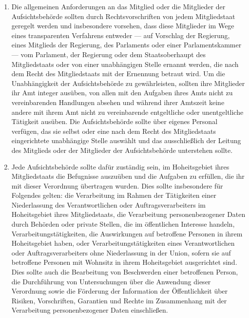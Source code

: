 \begin{enumerate}
   \item Die allgemeinen Anforderungen an das Mitglied oder die Mitglieder der Aufsichtsbehörde sollten durch
    Rechtsvorschriften von jedem Mitgliedstaat geregelt werden und insbesondere vorsehen, dass diese Mitglieder im Wege
    eines transparenten Verfahrens entweder — auf Vorschlag der Regierung, eines Mitglieds der Regierung, des
    Parlaments oder einer Parlamentskammer — vom Parlament, der Regierung oder dem Staatsoberhaupt des Mitgliedstaats
    oder von einer unabhängigen Stelle ernannt werden, die nach dem Recht des Mitgliedstaats mit der Ernennung betraut
    wird. Um die Unabhängigkeit der Aufsichtsbehörde zu gewährleisten, sollten ihre Mitglieder ihr Amt integer ausüben,
    von allen mit den Aufgaben ihres Amts nicht zu vereinbarenden Handlungen absehen und während ihrer Amtszeit keine
    andere mit ihrem Amt nicht zu vereinbarende entgeltliche oder unentgeltliche Tätigkeit ausüben. Die
    Aufsichtsbehörde sollte über eigenes Personal verfügen, das sie selbst oder eine nach dem Recht des Mitgliedstaats
    eingerichtete unabhängige Stelle auswählt und das ausschließlich der Leitung des Mitglieds oder der Mitglieder der
    Aufsichtsbehörde unterstehen sollte.%
   \label{eg:121}
   

   \item Jede Aufsichtsbehörde sollte dafür zuständig sein, im Hoheitsgebiet ihres Mitgliedstaats die Befugnisse
    auszuüben und die Aufgaben zu erfüllen, die ihr mit dieser Verordnung übertragen wurden. Dies sollte insbesondere
    für Folgendes gelten: die Verarbeitung im Rahmen der Tätigkeiten einer Niederlassung des Verantwortlichen oder
    Auftragsverarbeiters im Hoheitsgebiet ihres Mitgliedstaats, die Verarbeitung personenbezogener Daten durch Behörden
    oder private Stellen, die im öffentlichen Interesse handeln, Verarbeitungstätigkeiten, die Auswirkungen auf
    betroffene Personen in ihrem Hoheitsgebiet haben, oder Verarbeitungstätigkeiten eines Verantwortlichen oder
    Auftragsverarbeiters ohne Niederlassung in der Union, sofern sie auf betroffene Personen mit Wohnsitz in ihrem
    Hoheitsgebiet ausgerichtet sind. Dies sollte auch die Bearbeitung von Beschwerden einer betroffenen Person, die
    Durchführung von Untersuchungen über die Anwendung dieser Verordnung sowie die Förderung der Information der
    Öffentlichkeit über Risiken, Vorschriften, Garantien und Rechte im Zusammenhang mit der Verarbeitung
    personenbezogener Daten einschließen.%
   \label{eg:122}
   

\end{enumerate}
